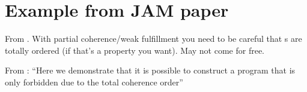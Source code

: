 \section{Example from JAM paper}
From \cite[]{DBLP:journals/pacmpl/BenderP19}.  With partial
coherence/weak fulfillment you need to be careful that \RMW{}s are totally
ordered (if that's a property you want).  May not come for free.

 From \cite[\textsection B]{DBLP:journals/pacmpl/BenderP19}:
``Here we demonstrate that it is possible to construct a program that is only
forbidden due to the total coherence order''

\begin{comment}
AArch64 TotalCO
{
0:X1=x; 0:X3=y; 
1:X1=x; 1:X3=y;
2:X1=x; 2:X3=y;
}
 P0            | P1           | P2;
 LDR X2,[X1]   | LDAR X5, [X3]| LDAR X5,[X1];
 MOV X0,#1     | MOV X2,#2    | MOV X0, #1;
 STR X0,[X1]   | STR X2,[X1]  | STR X0, [X3];

exists (0:X2=2 /\ 1:X5=1 /\ 2:X5=1)
\end{comment}



